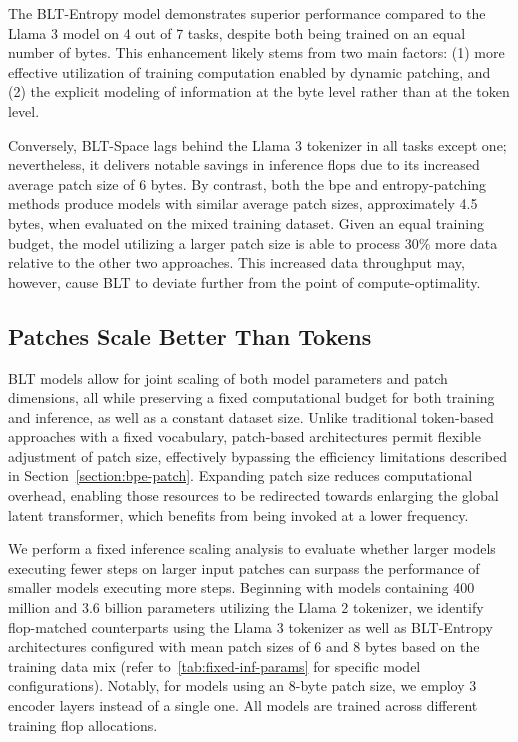 The {\textsc BLT}-Entropy model demonstrates superior performance compared to the Llama 3 model on 4 out of 7 tasks, despite both being trained on an equal number of bytes. This enhancement likely stems from two main factors: (1) more effective utilization of training computation enabled by dynamic patching, and (2) the explicit modeling of information at the byte level rather than at the token level.

Conversely, {\textsc BLT}-Space lags behind the Llama 3 tokenizer in all tasks except one; nevertheless, it delivers notable savings in inference flops due to its increased average patch size of 6 bytes. By contrast, both the bpe and entropy-patching methods produce models with similar average patch sizes, approximately 4.5 bytes, when evaluated on the mixed training dataset. Given an equal training budget, the model utilizing a larger patch size is able to process 30\% more data relative to the other two approaches. This increased data throughput may, however, cause {\textsc BLT} to deviate further from the point of compute-optimality.

\subsection{Patches Scale Better Than Tokens} {\textsc BLT} models allow for joint scaling of both model parameters and patch dimensions, all while preserving a fixed computational budget for both training and inference, as well as a constant dataset size. Unlike traditional token-based approaches with a fixed vocabulary, patch-based architectures permit flexible adjustment of patch size, effectively bypassing the efficiency limitations described in Section~\ref{section:bpe-patch}. Expanding patch size reduces computational overhead, enabling those resources to be redirected towards enlarging the global latent transformer, which benefits from being invoked at a lower frequency.

We perform a fixed inference scaling analysis to evaluate whether larger models executing fewer steps on larger input patches can surpass the performance of smaller models executing more steps. Beginning with models containing 400 million and 3.6 billion parameters utilizing the Llama 2 tokenizer, we identify flop-matched counterparts using the Llama 3 tokenizer as well as {\textsc BLT}-Entropy architectures configured with mean patch sizes of 6 and 8 bytes based on the training data mix (refer to~\autoref{tab:fixed-inf-params} for specific model configurations). Notably, for models using an 8-byte patch size, we employ 3 encoder layers instead of a single one. All models are trained across different training flop allocations.

